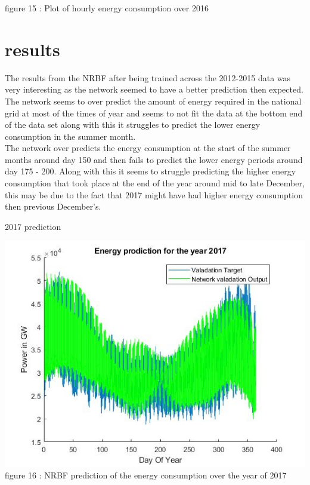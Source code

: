 \documentclass{IEEEtran}[11pt]
\begin{document}
\begin{flushleft}
  \vspace{1.5mm}
  {\footnotesize figure 15 : Plot of hourly energy consumption over 2016}
  \\
  \vspace{1.5mm}

\end{flushleft}
\section{results}
\begin{flushleft}
  The results from the NRBF after being trained across the 2012-2015 data was
  very interesting as the network seemed to have a better prediction then expected.
  The network seems to over predict the amount of energy required in the national
  grid at most of the times of year and seems to not fit the data at the bottom
  end of the data set along with this it struggles to predict the  lower energy
  consumption in the summer month.
  \\
  \vspace{1.5mm}
  The network over predicts the energy consumption
  at the start of the summer months around day 150 and then fails to predict the
  lower energy periods around day 175 - 200. Along with this it seems to struggle
  predicting the higher energy consumption that took place at the end of the year
  around mid to late December, this may be due to the fact that 2017 might have
  had higher energy consumption then previous December's.
  \vspace{1.5mm}
  \begin{center}
    2017 prediction
  \end{center}
  \vspace{1.5mm}
  \includegraphics[scale = 0.45]{2017prediction.jpg}
  \vspace{1.5mm}
  {\footnotesize figure 16 : NRBF prediction of the energy consumption over the
  year of 2017 }
  \\
  \vspace{1.5mm}


\end{flushleft}
\end{document}
